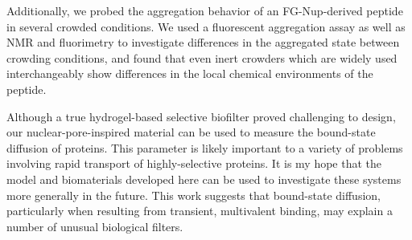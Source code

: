 Additionally, we probed the aggregation behavior of an FG-Nup-derived peptide in several crowded conditions.  We used a fluorescent aggregation assay as well as NMR and fluorimetry to investigate differences in the aggregated state between crowding conditions, and found that even inert crowders which are widely used interchangeably show differences in the local chemical environments of the peptide.

Although a true hydrogel-based selective biofilter proved challenging to design, our nuclear-pore-inspired material can be used to measure the bound-state diffusion of proteins.  This parameter is likely important to a variety of problems involving rapid transport of highly-selective proteins.  It is my hope that the model and biomaterials developed here can be used to investigate these systems more generally in the future.  This work suggests that bound-state diffusion, particularly when resulting from transient, multivalent binding, may explain a number of unusual biological filters.

